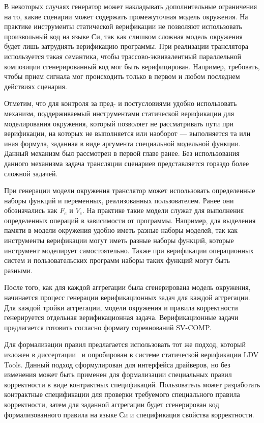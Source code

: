 \documentclass[%
candidate,     %
href,        %
colorlinks,  %
]{disser}
\begin{document}
В некоторых случаях генератор может накладывать дополнительные ограничения на то, какие сценарии может содержать промежуточная модель окружения.
На практике инструменты статической верификации не позволяют использовать произвольный код на языке Си, так как слишком сложная модель окружения будет лишь затруднять верификацию программы.
При реализации транслятора используется такая семантика, чтобы трассово-эквивалентный параллельной композиции сгенерированный код мог быть верифицирован.
Например, требовать, чтобы прием сигнала мог происходить только в первом и любом последнем действиях сценария.

Отметим, что для контроля за пред- и постусловиями удобно использовать механизм, поддерживаемый инструментами статической верификации для моделирования окружения, который позволяет не рассматривать пути при верификации, на которых не выполняется или наоборот --- выполняется та или иная формула, заданная в виде аргумента специальной модельной функции.
Данный механизм был рассмотрен в первой главе ранее.
Без использования данного механизма задача трансляции сценариев представляется гораздо более сложной задачей.

При генерации модели окружения транслятор может использовать определенные наборы функций и переменных, реализованных пользователем.
Ранее они обозначались как $F_e$ и $V_e$.
На практике такие модели служат для выполнения определенных операций в зависимости от программы.
Например, для выделения памяти в модели окружения удобно иметь разные наборы моделей, так как инструменты верификации могут иметь разные наборы функций, которые инструмент моделирует самостоятельно.
Также при верификации операционных систем и пользовательских программ наборы таких функций могут быть разными.

После того, как для каждой аггрегации была сгенерирована модель окружения, начинается процесс генерации верификационных задач для каждой аггрегации.
Для каждой тройки аггрегации, модели окружения и правила корректности генерируется отдельная верификационная задача.
Верификационные задачи предлагается готовить согласно формату соревнований SV-COMP.

Для формализации правил предлагается использовать тот же подход, который изложен в диссертации~\cite{NovikovDisser} и опробирован в системе статической верификации LDV Tools.
Данный подход сформулирован для интерфейса драйверов, но без изменения может быть применен для формализации специальных правил корректности в виде контрактных спецификаций.
Пользователь может разработать контрактные спецификации для проверки требуемого специального правила корректности, затем для заданной аггрегации будет сгенерирован код формализованного правила на языке Си и спецификация свойства корректности.
\end{document}

